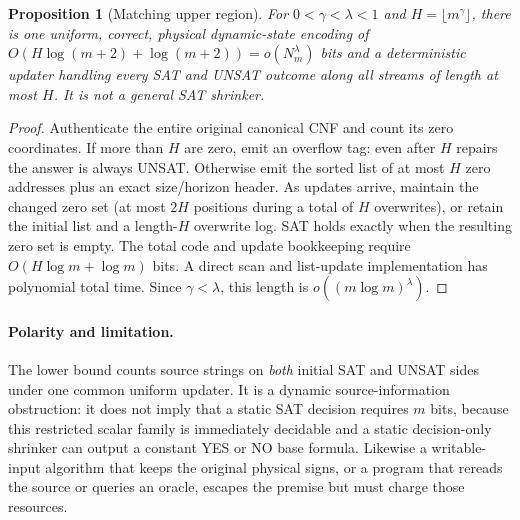 \documentclass[11pt]{article}
\newtheorem{proposition}[theorem]{Proposition}
\begin{document}
\begin{proposition}[Matching upper region]\label{prop:upper}
For $0<\gamma<\lambda<1$ and $H=\lfloor m^\gamma\rfloor$, there is one uniform, correct, physical dynamic-state encoding of $O(H\log(m+2)+\log(m+2))=o(N_m^\lambda)$ bits and a deterministic updater handling every SAT and UNSAT outcome along all streams of length at most $H$. It is not a general SAT shrinker.
\end{proposition}
\begin{proof}
Authenticate the entire original canonical CNF and count its zero coordinates. If more than $H$ are zero, emit an overflow tag: even after $H$ repairs the answer is always UNSAT. Otherwise emit the sorted list of at most $H$ zero addresses plus an exact size/horizon header. As updates arrive, maintain the changed zero set (at most $2H$ positions during a total of $H$ overwrites), or retain the initial list and a length-$H$ overwrite log. SAT holds exactly when the resulting zero set is empty. The total code and update bookkeeping require $O(H\log m+\log m)$ bits. A direct scan and list-update implementation has polynomial total time. Since $\gamma<\lambda$, this length is $o((m\log m)^\lambda)$.
\end{proof}

\paragraph{Polarity and limitation.} The lower bound counts source strings on \emph{both} initial SAT and UNSAT sides under one common uniform updater. It is a dynamic source-information obstruction: it does not imply that a static SAT decision requires $m$ bits, because this restricted scalar family is immediately decidable and a static decision-only shrinker can output a constant YES or NO base formula. Likewise a writable-input algorithm that keeps the original physical signs, or a program that rereads the source or queries an oracle, escapes the premise but must charge those resources.
\end{document}
